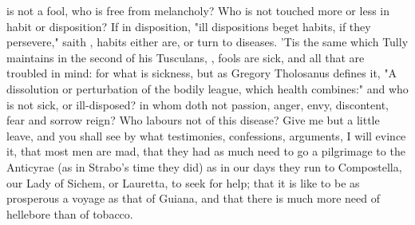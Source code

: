 is not a fool, who is free from melancholy? Who is not touched more or less in
habit or disposition? If in disposition, "ill dispositions beget habits, if
they persevere," saith , habits either
are, or turn to diseases. 'Tis the same which Tully maintains in the second of
his Tusculans, ,
fools are sick, and all that are troubled in mind: for what is sickness, but as
Gregory Tholosanus defines it, "A dissolution or
perturbation of the bodily league, which health combines:" and who is not sick,
or ill-disposed? in whom doth not passion, anger, envy, discontent, fear and
sorrow reign? Who labours not of this disease? Give me but a little leave, and
you shall see by what testimonies, confessions, arguments, I will evince it,
that most men are mad, that they had as much need to go a pilgrimage to the
Anticyrae (as in Strabo's time they did) as in our days
they run to Compostella, our Lady of Sichem, or Lauretta, to seek for help;
that it is like to be as prosperous a voyage as that of Guiana, and that there
is much more need of hellebore than of tobacco.

